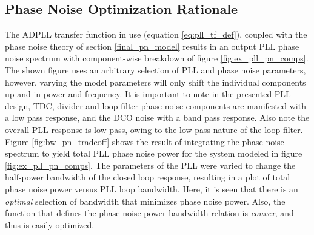 \subsection{Phase Noise Optimization Rationale}
The ADPLL transfer function in use (equation \ref{eq:pll_tf_def}), coupled with the phase noise theory of section \ref{final_pn_model} results in an output PLL phase noise spectrum with component-wise breakdown of figure \ref{fig:ex_pll_pn_comps}. The shown figure uses an arbitrary selection of PLL and phase noise parameters, however, varying the model parameters will only shift the individual components up and in power and frequency. It is important to note in the presented PLL design, TDC, divider and loop filter phase noise components are manifested with a low pass response, and the DCO noise with a band pass response. Also note the overall PLL response is low pass, owing to the low pass nature of the loop filter. Figure \ref{fig:bw_pn_tradeoff} shows the result of integrating the phase noise spectrum to yield total PLL phase noise power for the system modeled in figure \ref{fig:ex_pll_pn_comps}. The parameters of the PLL were varied to change the half-power bandwidth of the closed loop response, resulting in a plot of total phase noise power versus PLL loop bandwidth. Here, it is seen that there is an \textit{optimal} selection of bandwidth that minimizes phase noise power. Also, the function that defines the phase noise power-bandwidth relation is \textit{convex}, and thus is easily optimized. 
